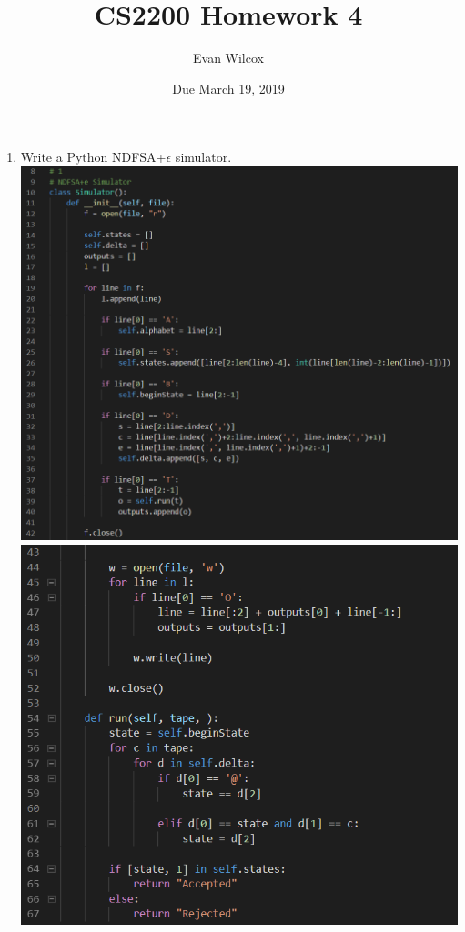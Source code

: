 \documentclass[a4paper]{article}
\title{CS2200 Homework 4}
\author{Evan Wilcox}
\date{Due March 19, 2019}
\begin{document}
  \maketitle

  \begin{enumerate}

    \item Write a Python NDFSA+$\epsilon$ simulator. \\
    \includegraphics[scale=0.5]{1a} \\
    \includegraphics[scale=0.5]{1b}    





\end{enumerate}
\end{document}
